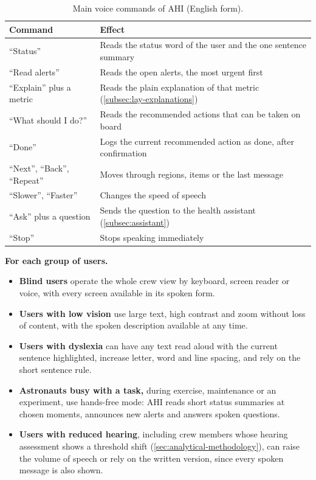\begin{table}[htbp]
\centering
\vspace{0.8em}
\caption{Main voice commands of AHI (English form).}
\label{tab:voice-commands}
\footnotesize
\begin{tabular}{p{3.8cm}p{10.2cm}}
\hline
\textbf{Command} & \textbf{Effect} \\
\hline
``Status'' & Reads the status word of the user and the one sentence summary \\
``Read alerts'' & Reads the open alerts, the most urgent first \\
``Explain'' plus a metric & Reads the plain explanation of that metric (\ref{subsec:lay-explanations}) \\
``What should I do?'' & Reads the recommended actions that can be taken on board \\
``Done'' & Logs the current recommended action as done, after confirmation \\
``Next'', ``Back'', ``Repeat'' & Moves through regions, items or the last message \\
``Slower'', ``Faster'' & Changes the speed of speech \\
``Ask'' plus a question & Sends the question to the health assistant (\ref{subsec:assistant}) \\
``Stop'' & Stops speaking immediately \\
\hline
\end{tabular}
\vspace{1.2em}
\end{table}

\medskip\noindent\textbf{For each group of users.}

\begin{itemize}
\item \textbf{Blind users} operate the whole crew view by keyboard, screen reader or voice, with every screen available in its spoken form.
\item \textbf{Users with low vision} use large text, high contrast and zoom without loss of content, with the spoken description available at any time.
\item \textbf{Users with dyslexia} can have any text read aloud with the current sentence highlighted, increase letter, word and line spacing, and rely on the short sentence rule.
\item \textbf{Astronauts busy with a task,} during exercise, maintenance or an experiment, use hands-free mode: AHI reads short status summaries at chosen moments, announces new alerts and answers spoken questions.
\item \textbf{Users with reduced hearing}, including crew members whose hearing assessment shows a threshold shift (\ref{sec:analytical-methodology}), can raise the volume of speech or rely on the written version, since every spoken message is also shown.
\end{itemize}

